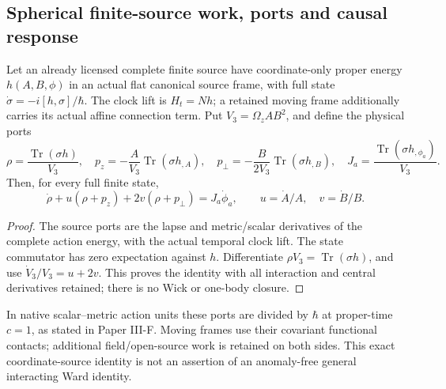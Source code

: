 \documentclass[12pt,a4paper]{article}
\begin{document}
\subsection{Spherical finite-source work, ports and causal response}
\label{p4:sec:spherical-dirac-source}

\begin{proposition}
\label{p4:prop:coordinate-source-work}
Let an already licensed complete finite source have coordinate-only proper
energy \(h(A,B,\phi)\) in an actual flat canonical source frame, with full
state \(\dot\sigma=-i[h,\sigma]/\hbar\). The clock lift is
\(H_t=Nh\); a retained moving frame additionally carries its actual affine
connection term. Put \(V_3=\Omega_z AB^2\), and define the physical ports
\[
 \rho=\frac{\operatorname{Tr}(\sigma h)}{V_3},\quad
 p_z=-\frac A{V_3}\operatorname{Tr}(\sigma h_{,A}),\quad
 p_\perp=-\frac B{2V_3}\operatorname{Tr}(\sigma h_{,B}),\quad
 J_a=\frac{\operatorname{Tr}(\sigma h_{,\phi_a})}{V_3}.
\]
Then, for every full finite state,
\begin{equation}
 \boxed{\dot\rho+u(\rho+p_z)+2v(\rho+p_\perp)
 =J_a\dot\phi_a,\qquad u=\dot A/A,\quad v=\dot B/B.}
 \label{p4:eq:coordinate-source-work}
\end{equation}
\end{proposition}
\begin{proof}
The source ports are the lapse and metric/scalar derivatives of the complete
action energy, with the actual temporal clock lift. The state commutator has
zero expectation against \(h\). Differentiate
\(\rho V_3=\operatorname{Tr}(\sigma h)\), and use
\(\dot V_3/V_3=u+2v\). This proves the identity with all interaction and
central derivatives retained; there is no Wick or one-body closure.
\end{proof}
In native scalar--metric action units these ports are divided by \(\hbar\)
at proper-time \(c=1\), as stated in Paper III-F. Moving frames use their
covariant functional contacts; additional field/open-source work is retained
on both sides. This exact coordinate-source identity is not an assertion of
an anomaly-free general interacting Ward identity.
\end{document}
